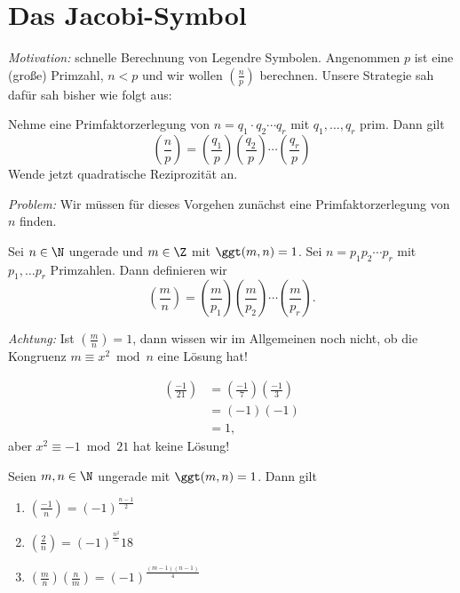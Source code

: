 \section{Das Jacobi-Symbol}

\emph{Motivation:} schnelle Berechnung von Legendre Symbolen. Angenommen $p$ ist eine (große) Primzahl, $n < p$ und wir wollen $\left(\frac{n}{p}\right)$ berechnen. Unsere Strategie sah dafür sah bisher wie folgt aus:

Nehme eine Primfaktorzerlegung von $n = q_1 \cdot q_2 \dotsm q_r$ mit $q_1,\dotsc,q_r$ prim. Dann gilt
\[ \left(\frac{n}{p}\right) = \left(\frac{q_1}{p}\right) \left(\frac{q_2}{p}\right) \dotsm \left(\frac{q_r}{p}\right) \]
Wende jetzt quadratische Reziprozität an.

\emph{Problem:} Wir müssen für dieses Vorgehen zunächst eine Primfaktorzerlegung von $n$ finden.

\begin{defn*}
	Sei $n \in \N$ ungerade und $m \in \Z$ mit $\ggt(m,n)=1$. Sei $n = p_1 p_2 \dotsm p_r$ mit $p_1,\dotsc p_r$ Primzahlen. Dann definieren wir
	\[ \left(\frac{m}{n}\right) = \left(\frac{m}{p_1}\right) \left(\frac{m}{p_2}\right) \dotsm \left(\frac{m}{p_r}\right). \]
\end{defn*}

\emph{Achtung:} Ist $\left(\frac{m}{n}\right)=1$, dann wissen wir im Allgemeinen noch nicht, ob die Kongruenz $m \equiv x^2 \bmod n$ eine Lösung hat!

\begin{exmp*}
	\begin{align*}
		\left(\frac{-1}{21}\right) &= \left(\frac{-1}{7}\right) \left(\frac{-1}{3}\right)\\
		&= (-1)(-1)\\
		&=1,
	\end{align*}
	aber $x^2 \equiv -1 \bmod 21$ hat keine Lösung!
\end{exmp*}

\begin{thm}\autolabel
	Seien $m,n \in \N$ ungerade mit $\ggt(m,n)=1$. Dann gilt
	\begin{enumerate}[label={\roman*})]
		\item $\left(\frac{-1}{n}\right) = (-1)^\frac{n-1}{2}$
		\item \( \left(\frac{2}{n}\right) = (-1)^\frac{n^2}-1{8} \)
		\item \( \left(\frac{m}{n}\right) \left(\frac{n}{m}\right) = (-1)^\frac{(m-1)(n-1)}{4} \)
	\end{enumerate}
\end{thm}